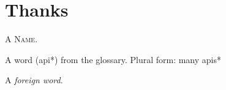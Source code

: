 \chapter*{\centering\vfill Thanks}

A \textsc{Name}.

\medskip

A word (\gls{api}*) from the glossary.
Plural form: many \glspl{api}*

\bigskip

A \textit{foreign word}.

\vfill
